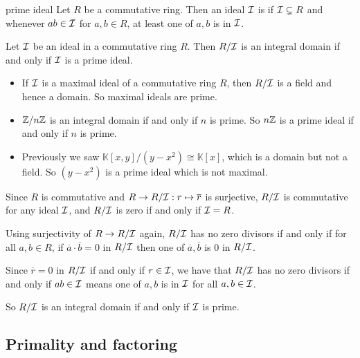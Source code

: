 \documentclass[12pt,letterpaper]{report}
\begin{document}
\begin{defn}{prime ideal}{}
  Let $R$ be a commutative ring.
  Then an ideal $\mathcal{I}$ is  if $\mathcal{I} \subsetneq R$ and whenever $ab \in \mathcal{I}$ for
  $a, b \in R$, at least one of $a, b$ is in $\mathcal{I}$.
\end{defn}

\begin{thm}{}{}
  Let $\mathcal{I}$ be an ideal in a commutative ring $R$.
  Then $R/\mathcal{I}$ is an integral domain if and only if $\mathcal{I}$ is a prime ideal.
\end{thm}

\begin{ex}
  \begin{itemize}
    \item If $\mathcal{I}$ is a maximal ideal of a commutative ring $R$, then $R/\mathcal{I}$ is a field and
    hence a domain.
    So maximal ideals are prime.
    \item $\mathbb{Z}/{n}\mathbb{Z}$ is an integral domain if and only if $n$ is prime.
    So $n\mathbb{Z}$ is a prime ideal if and only if $n$ is prime.
    \item Previously we saw $\mathbb{K}[x, y]/(y - x^2) \cong \mathbb{K}[x]$, which is a domain but
    not a field.
    So $(y - x^2)$ is a prime ideal which is not maximal.
  \end{itemize}
\end{ex}

\begin{thmproof}
  Since $R$ is commutative and $R \to R/\mathcal{I} : r \mapsto \overline{r}$ is surjective, $R/\mathcal{I}$
  is commutative for any ideal $\mathcal{I}$, and $R/\mathcal{I}$ is zero if and only if $\mathcal{I} = R$.

  Using surjectivity of $R \to R/\mathcal{I}$ again, $R/\mathcal{I}$ has no zero divisors if and only if
  for all $a, b \in R$, if $\overline{a} \cdot \overline{b} = 0$ in $R/\mathcal{I}$ then one of
  $\overline{a}, \overline{b}$ is 0 in $R/\mathcal{I}$.

  Since $\overline{r} = 0$ in $R/\mathcal{I}$ if and only if $r \in \mathcal{I}$, we have that $R/\mathcal{I}$ has
  no zero divisors if and only if $ab \in \mathcal{I}$ means one of $a, b$ is in $\mathcal{I}$ for all
  $a, b \in \mathcal{I}$.

  So $R/\mathcal{I}$ is an integral domain if and only if $\mathcal{I}$ is prime.
\end{thmproof}

\pagebreak
\subsection{Primality and factoring}
\end{document}
